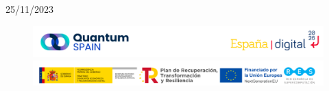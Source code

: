 \documentclass[a4paper,11pt]{book} %
\numberwithin{equation}{chapter}
\begin{document}
\begin{center}
\vspace{1cm}
{\large 25/11/2023}
\end{center}



	\begin{figure}[b]
	\centering 
	\includegraphics[width=1\linewidth]{Figuras/Fig-Logo_QS_EspanaDigital.png}
	\includegraphics[width=1\linewidth]{Figuras/Fig-LOGOS-GOB_QS.png}
	\end{figure}

\newpage
\thispagestyle{empty}
\mbox{}

\newpage
\pagestyle{plain}
\tableofcontents
\newpage









%
\end{document}
